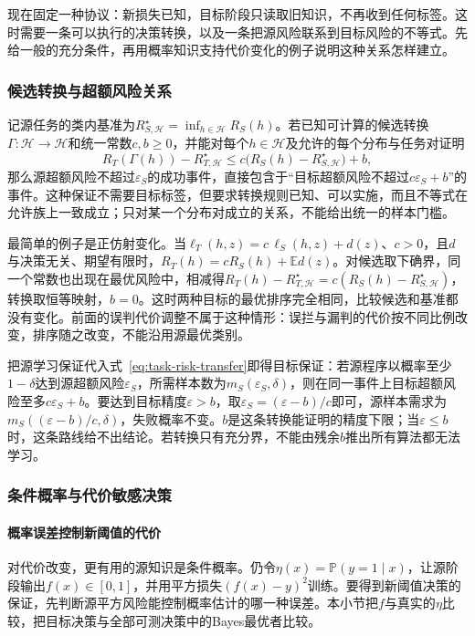 现在固定一种协议：新损失已知，目标阶段只读取旧知识，不再收到任何标签。这时需要一条可以执行的决策转换，以及一条把源风险联系到目标风险的不等式。先给一般的充分条件，再用概率知识支持代价变化的例子说明这种关系怎样建立。

\subsubsection{候选转换与超额风险关系}

记源任务的类内基准为$R_{S,\mathcal H}^{\star}=\inf_{h\in\mathcal H}R_S(h)$。若已知可计算的候选转换$\Gamma:\mathcal H\to\mathcal H$和统一常数$c,b\geq0$，并能对每个$h\in\mathcal H$及允许的每个分布与任务对证明
\begin{equation}
 R_T(\Gamma(h))-R_{T,\mathcal H}^{\star}
 \leq c\bigl(R_S(h)-R_{S,\mathcal H}^{\star}\bigr)+b ,
 \label{eq:task-risk-transfer}
\end{equation}
那么源超额风险不超过$\varepsilon_S$的成功事件，直接包含于“目标超额风险不超过$c\varepsilon_S+b$”的事件。这种保证不需要目标标签，但要求转换规则已知、可以实施，而且不等式在允许族上一致成立；只对某一个分布对成立的关系，不能给出统一的样本门槛。

最简单的例子是正仿射变化。当$\ell_T(h,z)=c\,\ell_S(h,z)+d(z)$、$c>0$，且$d$与决策无关、期望有限时，$R_T(h)=cR_S(h)+\mathbb E d(z)$。对候选取下确界，同一个常数也出现在最优风险中，相减得$R_T(h)-R_{T,\mathcal H}^{\star}=c(R_S(h)-R_{S,\mathcal H}^{\star})$，转换取恒等映射，$b=0$。这时两种目标的最优排序完全相同，比较候选和基准都没有变化。前面的误判代价调整不属于这种情形：误拦与漏判的代价按不同比例改变，排序随之改变，不能沿用源最优类别。

把源学习保证代入式~\eqref{eq:task-risk-transfer}即得目标保证：若源程序以概率至少$1-\delta$达到源超额风险$\varepsilon_S$，所需样本数为$m_S(\varepsilon_S,\delta)$，则在同一事件上目标超额风险至多$c\varepsilon_S+b$。要达到目标精度$\varepsilon>b$，取$\varepsilon_S=(\varepsilon-b)/c$即可，源样本需求为$m_S((\varepsilon-b)/c,\delta)$，失败概率不变。$b$是这条转换能证明的精度下限；当$\varepsilon\leq b$时，这条路线给不出结论。若转换只有充分界，不能由残余$b$推出所有算法都无法学习。

\subsubsection{条件概率与代价敏感决策}
\label{sec:task-probability-transfer}

\paragraph{概率误差控制新阈值的代价}
对代价改变，更有用的源知识是条件概率。仍令$\eta(x)=\mathbb P(y=1\mid x)$，让源阶段输出$f(x)\in[0,1]$，并用平方损失$(f(x)-y)^2$训练。要得到新阈值决策的保证，先判断源平方风险能控制概率估计的哪一种误差。本小节把$f$与真实的$\eta$比较，把目标决策与全部可测决策中的Bayes最优者比较。

